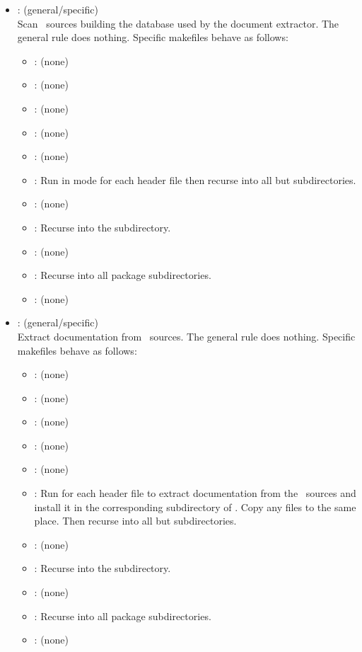 \begin{itemize}
\item
    : (general/specific)
   \\ Scan \cplusplus\ sources building the database used by the document
   extractor.  The general rule does nothing.  Specific makefiles behave as
   follows:
   \begin{itemize}
   \item
      : (none)
   \item
      : (none)
   \item
      : (none)
   \item
      : (none)
   \item
      : (none)
   \item
      : Run  in  mode for each header file
      then recurse into all but  subdirectories.
   \item
      : (none)
   \item
      : Recurse into the  subdirectory.
   \item
      : (none)
   \item
      : Recurse into all package subdirectories.
   \item
      : (none)
   \end{itemize}

\item
    : (general/specific)
   \\ Extract documentation from \cplusplus\ sources.  The general rule does
   nothing.  Specific makefiles behave as follows:
   \begin{itemize}
   \item
      : (none)
   \item
      : (none)
   \item
      : (none)
   \item
      : (none)
   \item
      : (none)
   \item
      : Run  for each header file to extract
      documentation from the \cplusplus\ sources and install it in the
      corresponding subdirectory of .  Copy any 
      files to the same place.  Then recurse into all but 
      subdirectories.
   \item
      : (none)
   \item
      : Recurse into the  subdirectory.
   \item
      : (none)
   \item
      : Recurse into all package subdirectories.
   \item
      : (none)
   \end{itemize}
\end{itemize}


